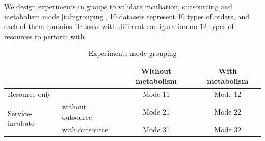 We design experiments in groups to validate incubation, outsourcing and metabolism mode \autoref{tab:grouping}, 10 datasets represent 10 types of orders, and each of them contains 10 tasks with different configuration on 12 types of resources to perform with.

\begin{table}[htbp]
  \centering
  \scriptsize
  \caption{Experiments mode grouping}
    \begin{tabular}{llcc}
    \toprule
          &       & Without metabolism & With metabolism \\
    \midrule
    \multicolumn{2}{l}{Resource-only} & Mode 11 & Mode 12 \\\hline
    \multicolumn{1}{l}{\multirow{2}[0]{*}{Service-incubate}} & without outsource & Mode 21 &Mode 22 \\\cline{2-4}
    \multicolumn{1}{l}{} & with outsource & Mode 31 & Mode 32 \\
    \bottomrule
    \end{tabular}%
  \label{tab:grouping}%
\end{table}%

